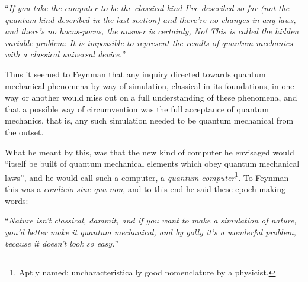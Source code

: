 \begin{displayquote}
\enquote{\emph{If you take the computer to be the classical kind I've described so far (not the quantum kind described in the last section) and there’re no changes in any laws, and there's no hocus-pocus, the answer is certainly, No! This is called the hidden variable problem: It is impossible to represent the results of quantum mechanics with a classical universal device.}}
\end{displayquote}

\noindent
Thus it seemed to Feynman that any inquiry directed towards quantum mechanical phenomena by way of simulation, classical in its foundations, in one way or another would miss out on a full understanding of these phenomena, and that a possible way of circumvention was the full acceptance of quantum mechanics, that is, any such simulation needed to be quantum mechanical from the outset. 


\clearpage
\noindent
What he meant by this, was that the new kind of computer he envisaged would \enquote{itself be built of quantum mechanical elements which obey quantum mechanical laws}, and he would call such a computer, a \emph{quantum computer}\footnote{Aptly named; uncharacteristically good nomenclature by a physicist.}. To Feynman this was a \emph{condicio sine qua non}, and to this end he said these epoch-making words:

\begin{displayquote}
	\enquote{\emph{Nature isn't classical, dammit, and if you want to make a simulation of nature, you'd better make it quantum mechanical, and by golly it's a wonderful problem, because it doesn't look so easy.}}
\end{displayquote}

